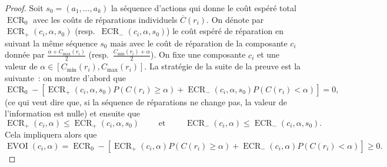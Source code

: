 \documentclass[a4paper,11pt]{article}
\theoremstyle{plain}
\DeclareMathOperator{\ECR}{ECR}
\DeclareMathOperator{\EVOI}{EVOI}
\begin{document}
\begin{proof}
Soit $s_0 = (a_1, \dotsc, a_k)$ la séquence d'actions qui donne le coût espéré total $\ECR_0$ avec les coûts de réparations individuels $\overline C(r_i)$. On dénote par $\ECR_+(c_i, \alpha, s_0)$ (resp.\ $\ECR_-(c_i, \alpha, s_0)$) le coût espéré de réparation en suivant la même séquence $s_0$ mais avec le coût de réparation de la composante $c_i$ donnée par $\frac{\alpha + C_{\max}(r_i)}{2}$ (resp.\ $\frac{C_{\min}(r_i) + \alpha}{2}$). On fixe une composante $c_i$ et une valeur de $\alpha \in [C_{\min}(r_i), C_{\max}(r_i)]$. La stratégie de la suite de la preuve est la suivante~: on montre d'abord que
\begin{equation}
\label{ProofEVOIFirstPart}
\ECR_0 - \left[\ECR_+(c_i, \alpha, s_0) P(C(r_i) \geq \alpha) + \ECR_-(c_i, \alpha, s_0) P(C(r_i) < \alpha)\right] = 0,
\end{equation}
(ce qui veut dire que, si la séquence de réparations ne change pas, la valeur de l'information est nulle) et ensuite que
\begin{equation}
\label{ProofEVOISecondPart}
\ECR_+(c_i, \alpha) \leq \ECR_+(c_i, \alpha, s_0) \qquad \text{ et } \qquad \ECR_-(c_i, \alpha) \leq \ECR_-(c_i, \alpha, s_0).
\end{equation}
Cela impliquera alors que
\[
\EVOI(c_i, \alpha) = \ECR_0 - \left[\ECR_+(c_i, \alpha) P(C(r_i) \geq \alpha) + \ECR_-(c_i, \alpha) P(C(r_i) < \alpha)\right] \geq 0.
\]


\end{proof}
\end{document}
